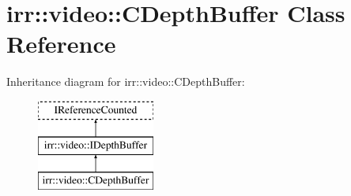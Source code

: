 \hypertarget{classirr_1_1video_1_1_c_depth_buffer}{\section{irr\-:\-:video\-:\-:C\-Depth\-Buffer Class Reference}
\label{classirr_1_1video_1_1_c_depth_buffer}
}
Inheritance diagram for irr\-:\-:video\-:\-:C\-Depth\-Buffer\-:\begin{figure}[H]
\begin{center}
\leavevmode
\includegraphics[height=3.000000cm]{classirr_1_1video_1_1_c_depth_buffer}
\end{center}
\end{figure}

